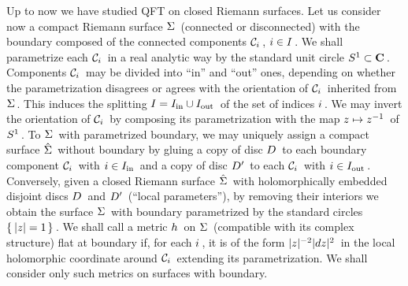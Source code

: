 \no Up to now we have studied QFT on
closed Riemann surfaces.
Let us consider now a compact Riemann surface
\s$\Sigma\hspace{0.05cm}$ (connected or disconnected)
with the boundary composed of the
connected components \s${\cal C}_i\hspace{0.05cm}$, \s$i\in I\hspace{0.05cm}$.
We shall parametrize each \s${\cal C}_i\hspace{0.05cm}$
in a real analytic way
by the standard unit circle \s$S^1\subset{{\bf C}}\hspace{0.05cm}$.
Components \s${\cal C}_i\hspace{0.05cm}$ may be divided
into ``in'' and ``out'' ones,
depending on whether the parametrization
disagrees or agrees with the orientation of \s${\cal C}_i\hspace{0.05cm}$
inherited from \s$\Sigma\hspace{0.05cm}$. This induces
the splitting \s$I=I_{\rm in}\cup I_{\rm out}\hspace{0.05cm}$
of the set of indices \s$i\hspace{0.05cm}$.
\s We may invert the orientation of \s${\cal C}_i\hspace{0.05cm}$
by composing its parametrization
with the map \s$z\mapsto z^{-1}\hspace{0.05cm}$ of
\s$S^1\hspace{0.05cm}$. \s To \s$\Sigma\hspace{0.05cm}$ with parametrized
boundary, we may uniquely assign a compact surface
\s$\hat\Sigma\hspace{0.05cm}$ without boundary by gluing a copy
of disc \s$D\hspace{0.05cm}$ to each boundary component \s${\cal C}_i\hspace{0.05cm}$
with \s$i\in I_{\rm in}\hspace{0.05cm}$ and
a copy of disc \s$D'\hspace{0.05cm}$ to each
\s${\cal C}_i\hspace{0.05cm}$ with \s$i\in I_{\rm out}\hspace{0.05cm}$.
\s Conversely, given a closed Riemann surface
\s$\hat\Sigma\hspace{0.05cm}$ with holomorphically
embedded disjoint discs \s$D\hspace{0.05cm}$
and \s$D'\hspace{0.05cm}$ (``local parameters''),
by removing their interiors we obtain the surface
\s$\Sigma\hspace{0.05cm}$ with boundary parametrized by the
standard circles \s$\{\s\m|z|=1\s\}\s$.
\s We shall call a metric
\s$h\hspace{0.05cm}$ on \s$\Sigma\hspace{0.05cm}$ (compatible with
its complex structure) flat at boundary if,
for each \s$i\hspace{0.05cm}$, \s it is of the
form \s$|z|^{-2}|dz|^2\hspace{0.05cm}$ in the
local holomorphic coordinate
around \s${\cal C}_i\hspace{0.05cm}$ extending its parametrization.
We shall consider only such metrics on surfaces
with boundary.
\vs 0.4cm

